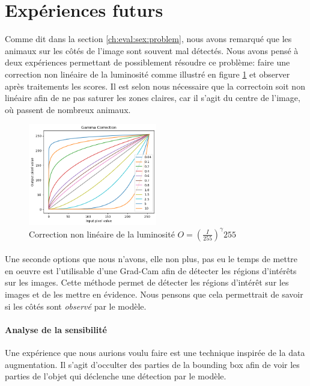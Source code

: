\section{Expériences futurs}
Comme dit dans la section \ref{ch:eval:sex:problem}, nous avons remarqué que les animaux sur les côtés de l'image sont souvent mal détectés. Nous avons pensé à deux expériences permettant de possiblement résoudre ce problème: faire une correction non linéaire de la luminosité comme illustré en figure \ref{fig:gamma_correction} et observer après traitements les scores. Il est selon nous nécessaire que la correctoin soit non linéaire afin de ne pas saturer les zones claires, car il s'agit du centre de l'image, où passent de nombreux animaux.
\begin{figure}[H]
\centering
\includegraphics[width=0.5\textwidth]{images/gamma_correction.png}
\caption{Correction non linéaire de la luminosité $O = \displaystyle{\left( \frac{I}{255} \right)^\gamma255}$}
\label{fig:gamma_correction}
\end{figure}

\paragraph{}
Une seconde options que nous n'avons, elle non plus, pas eu le temps de mettre en oeuvre est l'utilisable d'une Grad-Cam afin de détecter les régions d'intérêts sur les images. Cette méthode permet de détecter les régions d'intérêt sur les images et de les mettre en évidence. Nous pensons que cela permettrait de savoir si les côtés sont \textit{observé} par le modèle.

\paragraph{Analyse de la sensibilité}
Une expérience que nous aurions voulu faire est une technique inspirée de la data augmentation. Il s'agit d'occulter des parties de la bounding box afin de voir les parties de l'objet qui déclenche une détection par le modèle.
